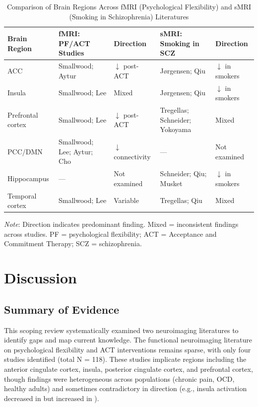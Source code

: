 \documentclass[12pt]{article}
\begin{document}
\begin{table}[htbp]
\centering
\caption{Comparison of Brain Regions Across fMRI (Psychological Flexibility) and sMRI (Smoking in Schizophrenia) Literatures}
\label{tab:overlap}
\small
\begin{tabular}{p{2.5cm}p{3.5cm}p{2cm}p{3.5cm}p{2cm}}
\toprule
Brain Region & fMRI: PF/ACT Studies & Direction & sMRI: Smoking in SCZ & Direction \\
\midrule
ACC & Smallwood; Aytur & $\downarrow$ post-ACT & J{\o}rgensen; Qiu & $\downarrow$ in smokers \\
Insula & Smallwood; Lee & Mixed & J{\o}rgensen; Qiu & $\downarrow$ in smokers \\
Prefrontal cortex & Smallwood; Lee & $\downarrow$ post-ACT & Tregellas; Schneider; Yokoyama & Mixed \\
PCC/DMN & Smallwood; Lee; Aytur; Cho & $\downarrow$ connectivity & --- & Not examined \\
Hippocampus & --- & Not examined & Schneider; Qiu; Musket & $\downarrow$ in smokers \\
Temporal cortex & Smallwood; Lee & Variable & Tregellas; Qiu & Mixed \\
\bottomrule
\end{tabular}

\vspace{0.5em}
\footnotesize\textit{Note}: Direction indicates predominant finding. Mixed = inconsistent findings across studies. PF = psychological flexibility; ACT = Acceptance and Commitment Therapy; SCZ = schizophrenia.
\end{table}

\section{Discussion}

\subsection{Summary of Evidence}

This scoping review systematically examined two neuroimaging literatures to identify gaps and map current knowledge. The functional neuroimaging literature on psychological flexibility and ACT interventions remains sparse, with only four studies identified (total N = 118). These studies implicate regions including the anterior cingulate cortex, insula, posterior cingulate cortex, and prefrontal cortex, though findings were heterogeneous across populations (chronic pain, OCD, healthy adults) and sometimes contradictory in direction (e.g., insula activation decreased in \citealt{smallwood2016} but increased in \citealt{lee2023}).
\end{document}
